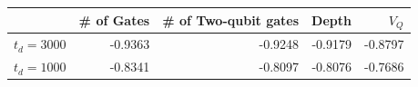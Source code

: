 \begin{center}
\begin{tabular}{lrrrr}
 & \# of Gates & \# of Two-qubit gates & Depth & \(V_Q\)\\
\hline
\(t_d = 3000\) & -0.9363 & -0.9248 & -0.9179 & -0.8797\\
\(t_d = 1000\) & -0.8341 & -0.8097 & -0.8076 & -0.7686\\
\hline
\end{tabular}
\end{center}
